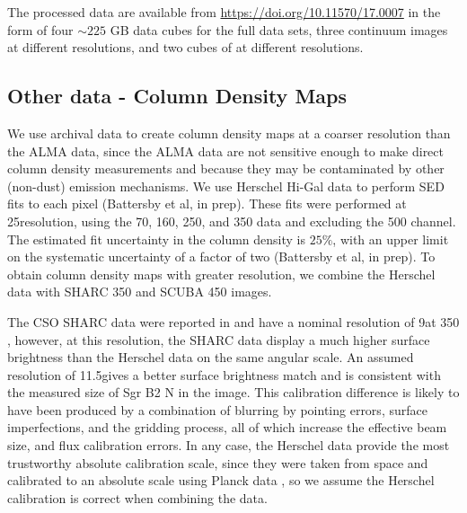 \documentclass[twocolumn]{aastex61}
\begin{document}
The processed data are available from \url{https://doi.org/10.11570/17.0007} in
the form of four $\sim225$ GB data cubes for the full data sets, three
continuum images at different resolutions, and two cubes of \cyanoacetylene at
different resolutions. 

\subsection{Other data - Column Density Maps}
\label{sec:colmaps}
We use archival data to create column density maps at a coarser
resolution than the ALMA data, since the ALMA data are not sensitive
enough to make direct column density measurements and because they
may be contaminated by other (non-dust) emission mechanisms.   We use Herschel
Hi-Gal data \citep{Molinari2010a} to perform SED fits to each pixel (Battersby
et al, in prep).  These fits were performed at 25\arcsec resolution, using the
70, 160, 250, and 350 \um data and excluding the 500 \um channel.  The
estimated fit uncertainty in the column density is $25\%$, with an upper limit
on the systematic uncertainty of a factor of two (Battersby et al, in prep).
To obtain column density maps with greater resolution, we combine the Herschel
data with SHARC 350 \um and
SCUBA 450 \um images.


The CSO SHARC data were reported in \citet{Bally2010a} and have a nominal
resolution of 9\arcsec at 350 \um, however, at this resolution, the SHARC data
display a much higher surface brightness than the Herschel data on the same
angular scale.  An assumed resolution of 11.5\arcsec gives a better surface
brightness match and is consistent with the measured size of Sgr B2 N in the
image.  This calibration difference is likely to have been produced by a
combination of blurring by pointing errors, surface imperfections, and the
gridding process, all of which increase the effective beam size, and flux
calibration errors.  In any case, the Herschel data provide the most
trustworthy absolute calibration scale, since they were taken from space and
calibrated to an absolute scale using Planck data
\citep{Bendo2013a,Bertincourt2016a}, so we assume the Herschel calibration is
correct when combining the data.
\end{document}
